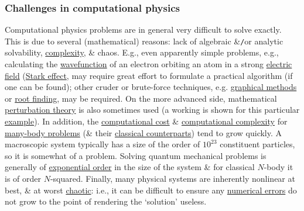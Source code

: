 \documentclass{article}
\begin{document}
\subsubsection{Challenges in computational physics}
Computational physics problems are in general very difficult to solve exactly. This is due to several (mathematical) reasons: lack of algebraic \&{\tt/}or analytic solvability, \href{https://en.wikipedia.org/wiki/Complexity}{complexity}, \& chaos. E.g., even apparently simple problems, e.g., calculating the \href{https://en.wikipedia.org/wiki/Wavefunction}{wavefunction} of an electron orbiting an atom in a strong \href{https://en.wikipedia.org/wiki/Electric_field}{electric field} (\href{https://en.wikipedia.org/wiki/Stark_effect}{Stark effect}, may require great effort to formulate a practical algorithm (if one can be found); other cruder or brute-force techniques, e.g. \href{https://en.wikipedia.org/wiki/Graphical_method}{graphical methods} or \href{https://en.wikipedia.org/wiki/Root_finding}{root finding}, may be required. On the more advanced side, mathematical \href{https://en.wikipedia.org/wiki/Perturbation_theory}{perturbation theory} is also sometimes used (a working is shown for this particular \href{https://en.wikipedia.org/wiki/Perturbation_theory#Example_of_degenerate_perturbation_theory_%E2%80%93_Stark_effect_in_resonant_rotating_wave}{example}). In addition, the \href{https://en.wikipedia.org/wiki/Computational_cost}{computational cost} \& \href{https://en.wikipedia.org/wiki/Computational_complexity_theory}{computational complexity} for \href{https://en.wikipedia.org/wiki/Many-body_problem}{many-body problems} (\& their \href{https://en.wikipedia.org/wiki/N-body_problem}{classical counterparts}) tend to grow quickly. A macroscopic system typically has a size of the order of $10^{23}$ constituent particles, so it is somewhat of a problem. Solving quantum mechanical problems is generally of \href{https://en.wikipedia.org/wiki/EXP}{exponential order} in the size of the system \& for classical $N$-body it is of order $N$-squared. Finally, many physical systems are inherently nonlinear at best, \& at worst \href{https://en.wikipedia.org/wiki/Chaos_theory}{chaotic}: i.e., it can be difficult to ensure any \href{https://en.wikipedia.org/wiki/Numerical_error}{numerical errors} do not grow to the point of rendering the `solution' useless.
\end{document}
